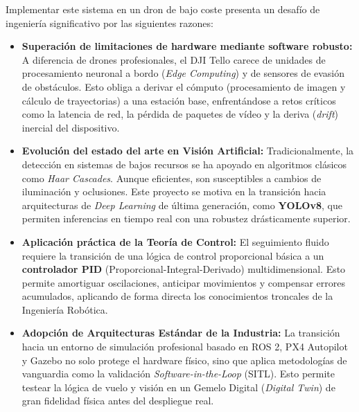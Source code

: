 Implementar este sistema en un dron de bajo coste presenta un desafío de ingeniería significativo por las siguientes razones:

\begin{itemize}
    \item \textbf{Superación de limitaciones de hardware mediante software robusto:} A diferencia de drones profesionales, el DJI Tello carece de unidades de procesamiento neuronal a bordo (\textit{Edge Computing}) y de sensores de evasión de obstáculos. Esto obliga a derivar el cómputo (procesamiento de imagen y cálculo de trayectorias) a una estación base, enfrentándose a retos críticos como la latencia de red, la pérdida de paquetes de vídeo y la deriva (\textit{drift}) inercial del dispositivo.
    
    \item \textbf{Evolución del estado del arte en Visión Artificial:} Tradicionalmente, la detección en sistemas de bajos recursos se ha apoyado en algoritmos clásicos como \textit{Haar Cascades}. Aunque eficientes, son susceptibles a cambios de iluminación y oclusiones. Este proyecto se motiva en la transición hacia arquitecturas de \textit{Deep Learning} de última generación, como \textbf{YOLOv8}, que permiten inferencias en tiempo real con una robustez drásticamente superior.
    
    \item \textbf{Aplicación práctica de la Teoría de Control:} El seguimiento fluido requiere la transición de una lógica de control proporcional básica a un \textbf{controlador PID} (Proporcional-Integral-Derivado) multidimensional. Esto permite amortiguar oscilaciones, anticipar movimientos y compensar errores acumulados, aplicando de forma directa los conocimientos troncales de la Ingeniería Robótica.
    
    \item \textbf{Adopción de Arquitecturas Estándar de la Industria:} La transición hacia un entorno de simulación profesional basado en ROS 2, PX4 Autopilot y Gazebo no solo protege el hardware físico, sino que aplica metodologías de vanguardia como la validación \textit{Software-in-the-Loop} (SITL). Esto permite testear la lógica de vuelo y visión en un Gemelo Digital (\textit{Digital Twin}) de gran fidelidad física antes del despliegue real.
\end{itemize}
